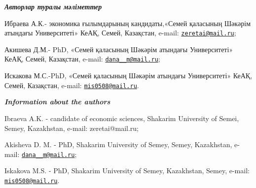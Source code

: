 \begin{authorinfo}

\hspace{1em}\emph{{\bfseries Авторлар туралы мәліметтер}}

Ибраева А.К.- экономика ғылымдарының кандидаты,«Семей қаласының Шәкәрім
атындағы Университеті» КеАҚ, Семей, Казақстан, e-mail:
\href{mailto:ZEretai@mail.ru}{\nolinkurl{zeretai@mail.ru}};

Акишева Д.М.- PhD, «Семей қаласының Шәкәрім атындағы Университеті» КеАҚ,
Семей, Казақстан, \linebreak e-mail:
\href{mailto:dana__m@mail.ru}{\nolinkurl{dana\_\_m@mail.ru}};

Искакова М.С.-PhD, «Семей қаласының Шәкәрім атындағы Университеті» КеАҚ,
Семей, Казақстан, \linebreak e-mail:
\href{mailto:mis0508@mail.ru}{\nolinkurl{mis0508@mail.ru}}.

\hspace{1em}\emph{{\bfseries Information about the authors}}

Ibraeva A.K. - candidate of economic sciences, Shakarim University of
Semei, Semey, Kazakhstan, e-mail: zeretai@mail.ru;

Akisheva D. M. - PhD, Shakarim University of Semey, Semey, Kazakhstan,
e-mail: \href{mailto:dana__m@mail.ru}{\nolinkurl{dana\_\_m@mail.ru}};

Iskakova M.S. - PhD, Shakarim University of Semey, Kazakhstan, Semey,
e-mail: \href{mailto:mis0508@mail.ru}{\nolinkurl{mis0508@mail.ru}}. 
\end{authorinfo}
